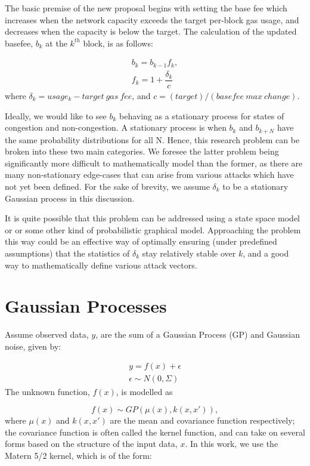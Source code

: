 \documentclass[peerreview]{ieeesyscoin}
\begin{document}
The basic premise of the new proposal begins with setting the base fee which increases when the network capacity exceeds the target per-block gas usage, and decreases when the capacity is below the target. The calculation of the updated basefee, $b_{k}$ at the $k^{th}$ block,  is as follows:

\begin{eqnarray} \label{eq:eip1559}
b_{k} = b_{k-1} f_{k}, \\
f_{k} = 1 + \dfrac{\delta_{k}}{c}
\end{eqnarray}
where $\delta_{k} = usage_{k} - target~gas~fee$, and $c = (target)/(basefee~max~change)$.

Ideally, we would like to see $b_{k}$ behaving as a stationary process for states of congestion and non-congestion. A stationary process is when $b_{k}$ and $b_{k+N}$ have the same probability distributions for all N. Hence, this research problem can be broken into these two main categories. We foresee the latter problem being significantly more difficult to mathematically model than the former, as there are many non-stationary edge-cases that can arise from various attacks which have not yet been defined. For the sake of brevity, we assume $\delta_{k}$ to be a stationary Gaussian process in this discussion.

It is quite possible that this problem can be addressed using a state space model or or some other kind of probabilistic graphical model. Approaching the problem this way could be an effective way of optimally ensuring (under predefined assumptions) that the statistics of $\delta_{k}$ stay relatively stable over $k$, and a good way to mathematically define various attack vectors.

\section{Gaussian Processes}
\label{appendix:marginal}

Assume observed data, $y$, are the sum of a Gaussian Process (GP) and Gaussian noise, given by:

\begin{eqnarray}
y = f(x) + \epsilon \\
\epsilon \sim N(0,\Sigma) 
\end{eqnarray}
The unknown function, $f(x)$, is modelled as

\begin{equation}
f(x) \sim GP(\mu(x), k(x,x')),
\end{equation}
where $\mu(x)$ and $k(x,x')$ are the mean and covariance function respectively; the covariance function is often called the kernel function, and can take on several forms based on the structure of the input data, $x$. In this work, we use the Matern 5/2 kernel, which is of the form:
\end{document}
